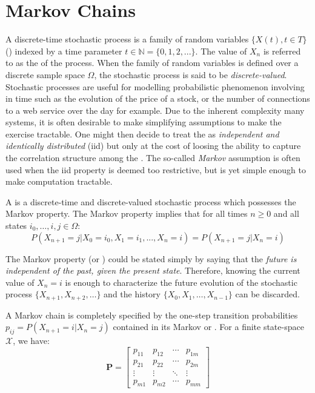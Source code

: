 \section{Markov Chains}

A discrete-time stochastic process is a family of random variables $\{ X(t), t \in T\}$
(\rvs) indexed by a time parameter $t \in \mathbb{N} = \{0, 1, 2,...\}$. The
value of $X_n$ is referred to as the  of the process. When the family of
random variables is defined over a discrete sample space
$\Omega$, the stochastic process is said to be \textit{discrete-valued}.
Stochastic processes are useful for modelling probabilistic phenomenon involving in
time such as the evolution of the price of a stock, or the
number of connections to a web service over the day for example. Due to the inherent
complexity many systems, it is often desirable to make simplifying assumptions to
make the exercise tractable. One might then decide to treat the \rvs as
\textit{independent and identically distributed} (iid) but only at the cost of loosing the ability to
capture the correlation structure among the \rvs. The so-called \textit{Markov}
assumption is often used when the iid property is deemed too restrictive, but is yet
simple enough to make computation tractable.

\begin{defn}
A  is a discrete-time and discrete-valued stochastic process
which possesses the Markov property. The Markov property implies that for all times $n \geq
0$ and all states $i_0, \dots, i, j \in \Omega$:
\begin{equation}
P(X_{n+1} = j | X_0 = i_0, X_1 = i_1, ..., X_n = i) = P( X_{n+1} = j | X_n = i)
\end{equation}
\end{defn}

The Markov property (or ) could be stated simply by
saying that the \textit{future is independent of the past, given the present state}.
Therefore, knowing the current value of $X_n = i$ is enough to characterize the
future evolution of the stochastic process $\{X_{n+1}, X_{n+2}, \dots \}$ and the history
$\{X_0, X_1,\dots, X_{n-1} \}$ can be discarded.

A Markov chain is completely specified by the one-step transition probabilities
$p_{ij} = P(X_{n+1} = i | X_n = j)$ contained in its Markov or
. For a finite state-space $\mathcal{X}$, we have:
\begin{equation}
\mathbf{P} = \begin{bmatrix}
p_{11} & p_{12} & \cdots & p_{1m} \\
p_{21} & p_{22} & \cdots & p_{2m} \\
\vdots & \vdots & \ddots & \vdots \\
p_{m1} & p_{m2} & \cdots & p_{mm}
\end{bmatrix}
\end{equation}

